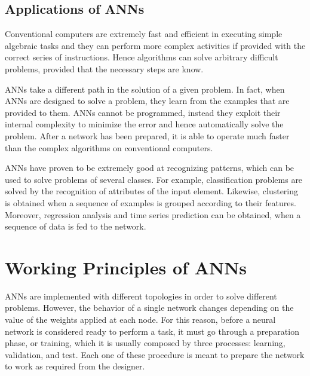 \subsection{Applications of ANNs}
\label{ssec:Applications_of_ANNs}
Conventional computers are extremely fast and efficient in executing simple algebraic tasks and they can perform more complex activities if provided with the correct series of instructions.
Hence algorithms can solve arbitrary difficult problems, provided that the necessary steps are know.

\aclp{ANN} take a different path in the solution of a given problem.
In fact, when \acsp{ANN} are designed to solve a problem, they learn from the examples that are provided to them.
\acsp{ANN} cannot be programmed, instead they exploit their internal complexity to minimize the error and hence automatically solve the problem.
After a network has been prepared, it is able to operate much faster than the complex algorithms on conventional computers.

\acsp{ANN} have proven to be extremely good at recognizing patterns, which can be used to solve problems of several classes.
For example, classification problems are solved by the recognition of attributes of the input element.
Likewise, clustering is obtained when a sequence of examples is grouped according to their features.
Moreover, regression analysis and time series prediction can be obtained, when a sequence of data is fed to the network.

\section{Working Principles of ANNs}
\label{sec:Working_Principles_of_ANNs}
\acsp{ANN} are implemented with different topologies in order to solve different problems.
However, the behavior of a single network changes depending on the value of the weights applied at each node.
For this reason, before a neural network is considered ready to perform a task, it must go through a preparation phase, or training, which it is usually composed by three processes: learning, validation, and test.
Each one of these procedure is meant to prepare the network to work as required from the designer.

